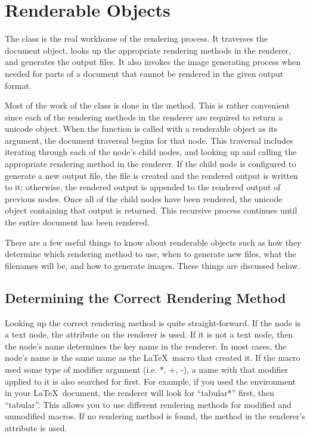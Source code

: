 \section{Renderable Objects\label{sec:renderable}}

The  class is the real workhorse of the rendering process.
It traverses the document object, looks up the appropriate rendering
methods in the renderer, and generates the output files.  It also
invokes the image generating process when needed for parts of a document
that cannot be rendered in the given output format.

Most of the work of the  class is done in the
 method.  This is rather convenient since each of
the rendering methods in the renderer are required to return a unicode
object.  When the  function is called with a renderable
object as its argument, the document traversal begins for that node.
This traversal includes iterating through each of the node's child nodes, and
looking up and calling the appropriate rendering method in the renderer.
If the child node is configured to generate a new output file, the
file is created and the rendered output is written to it; otherwise,
the rendered output is appended to the rendered output of previous nodes.
Once all of the child nodes have been rendered, the unicode object containing
that output is returned.  This recursive process continues until the
entire document has been rendered.

There are a few useful things to know about renderable objects such as
how they determine which rendering method to use, when to generate new
files, what the filenames will be, and how to generate images.  These
things are discussed below.


\subsection{Determining the Correct Rendering Method}

Looking up the correct rendering method is quite straight-forward.
If the node is a text node, the  attribute on
the renderer is used.  If it is not a text node, then the node's name
determines the key name in the renderer.  In most cases, the node's
name is the same name as the \LaTeX\ macro that created it.  If the
macro used some type of modifier argument (i.e. *, +, -), a name
with that modifier applied to it is also searched for first.  For example,
if you used the  environment in your \LaTeX\
document, the renderer will look for ``tabular*'' first, then ``tabular''.
This allows you to use different rendering methods for modified and
unmodified macros.  If no rendering method is found, the method
in the renderer's  attribute is used.


